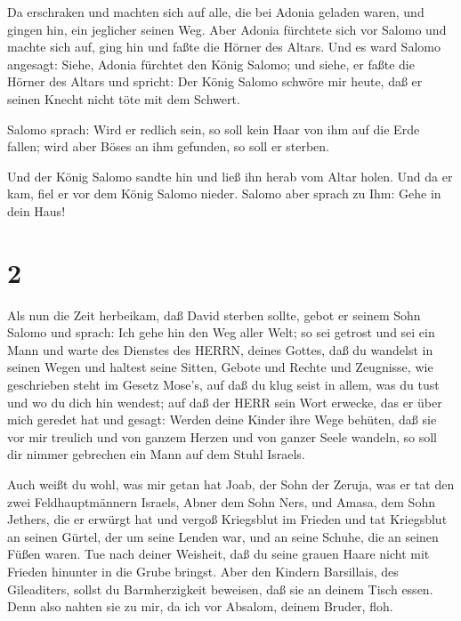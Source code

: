  Da erschraken und machten sich auf alle, die bei Adonia
geladen waren, und gingen hin, ein jeglicher seinen Weg. 
Aber Adonia fürchtete sich vor Salomo und machte sich auf, ging hin und
faßte die Hörner des Altars.  Und es ward Salomo angesagt:
Siehe, Adonia fürchtet den König Salomo; und siehe, er faßte die Hörner
des Altars und spricht: Der König Salomo schwöre mir heute, daß er
seinen Knecht nicht töte mit dem Schwert.

 Salomo sprach: Wird er redlich sein, so soll kein Haar von
ihm auf die Erde fallen; wird aber Böses an ihm gefunden, so soll er
sterben.

 Und der König Salomo sandte hin und ließ ihn herab vom
Altar holen. Und da er kam, fiel er vor dem König Salomo nieder. Salomo
aber sprach zu Ihm: Gehe in dein Haus!

\hypertarget{section-1}{%
\section{2}\label{section-1}}

 Als nun die Zeit herbeikam, daß David sterben sollte, gebot
er seinem Sohn Salomo und sprach:  Ich gehe hin den Weg
aller Welt; so sei getrost und sei ein Mann  und warte des
Dienstes des HERRN, deines Gottes, daß du wandelst in seinen Wegen und
haltest seine Sitten, Gebote und Rechte und Zeugnisse, wie geschrieben
steht im Gesetz Mose's, auf daß du klug seist in allem, was du tust und
wo du dich hin wendest;  auf daß der HERR sein Wort erwecke,
das er über mich geredet hat und gesagt: Werden deine Kinder ihre Wege
behüten, daß sie vor mir treulich und von ganzem Herzen und von ganzer
Seele wandeln, so soll dir nimmer gebrechen ein Mann auf dem Stuhl
Israels.

 Auch weißt du wohl, was mir getan hat Joab, der Sohn der
Zeruja, was er tat den zwei Feldhauptmännern Israels, Abner dem Sohn
Ners, und Amasa, dem Sohn Jethers, die er erwürgt hat und vergoß
Kriegsblut im Frieden und tat Kriegsblut an seinen Gürtel, der um seine
Lenden war, und an seine Schuhe, die an seinen Füßen waren. 
Tue nach deiner Weisheit, daß du seine grauen Haare nicht mit Frieden
hinunter in die Grube bringst.  Aber den Kindern Barsillais,
des Gileaditers, sollst du Barmherzigkeit beweisen, daß sie an deinem
Tisch essen. Denn also nahten sie zu mir, da ich vor Absalom, deinem
Bruder, floh.

